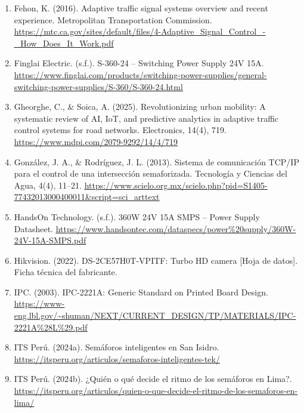 \begin{enumerate}
\item
  Fehon, K. (2016). Adaptive traffic signal systems overview and recent experience. Metropolitan Transportation Commission. \href{https://mtc.ca.gov/sites/default/files/4-Adaptive_Signal_Control_-_How_Does_It_Work.pdf}{\ul{https://mtc.ca.gov/sites/default/files/4-Adaptive\_Signal\_Control\_-\_How\_Does\_It\_Work.pdf}}
\item
  Finglai Electric. (s.f.). S-360-24 -- Switching Power Supply 24V 15A. \href{https://www.finglai.com/products/switching-power-supplies/general-switching-power-supplies/S-360/S-360-24.html}{\ul{https://www.finglai.com/products/switching-power-supplies/general-switching-power-supplies/S-360/S-360-24.html}}
\item
  Gheorghe, C., \& Soica, A. (2025). Revolutionizing urban mobility: A systematic review of AI, IoT, and predictive analytics in adaptive traffic control systems for road networks. Electronics, 14(4), 719. \href{https://www.mdpi.com/2079-9292/14/4/719}{\ul{https://www.mdpi.com/2079-9292/14/4/719}}
\item
  González, J. A., \& Rodríguez, J. L. (2013). Sistema de comunicación TCP/IP para el control de una intersección semaforizada. Tecnología y Ciencias del Agua, 4(4), 11--21. \href{https://www.scielo.org.mx/scielo.php?pid=S1405-77432013000400011&script=sci_arttext}{\ul{https://www.scielo.org.mx/scielo.php?pid=S1405-77432013000400011\&script=sci\_arttext}}
\item
  HandsOn Technology. (s.f.). 360W 24V 15A SMPS -- Power Supply Datasheet. \href{https://www.handsontec.com/dataspecs/power\%20supply/360W-24V-15A-SMPS.pdf}{\ul{https://www.handsontec.com/dataspecs/power\%20supply/360W-24V-15A-SMPS.pdf}}
\item
  Hikvision. (2022). DS-2CE57H0T-VPITF: Turbo HD camera {[}Hoja de datos{]}. Ficha técnica del fabricante.
\item
  IPC. (2003). IPC-2221A: Generic Standard on Printed Board Design. \href{https://www-eng.lbl.gov/~shuman/NEXT/CURRENT_DESIGN/TP/MATERIALS/IPC-2221A\%28L\%29.pdf}{\ul{https://www-eng.lbl.gov/\textasciitilde shuman/NEXT/CURRENT\_DESIGN/TP/MATERIALS/IPC-2221A\%28L\%29.pdf}}
\item
  ITS Perú. (2024a). Semáforos inteligentes en San Isidro. \href{https://itsperu.org/articulos/semaforos-inteligentes-tek/}{\ul{https://itsperu.org/articulos/semaforos-inteligentes-tek/}}
\item
  ITS Perú. (2024b). ¿Quién o qué decide el ritmo de los semáforos en Lima?. \href{https://itsperu.org/articulos/quien-o-que-decide-el-ritmo-de-los-semaforos-en-lima/}{\ul{https://itsperu.org/articulos/quien-o-que-decide-el-ritmo-de-los-semaforos-en-lima/}}

\end{enumerate}
